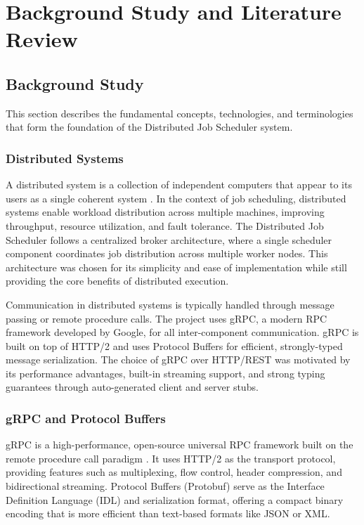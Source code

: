 \chapter{Background Study and Literature Review}

\section{Background Study}

This section describes the fundamental concepts, technologies, and terminologies that form the foundation of the Distributed Job Scheduler system.

\subsection{Distributed Systems}

A distributed system is a collection of independent computers that appear to its users as a single coherent system \cite{vansteen2017distributed}. In the context of job scheduling, distributed systems enable workload distribution across multiple machines, improving throughput, resource utilization, and fault tolerance. The Distributed Job Scheduler follows a centralized broker architecture, where a single scheduler component coordinates job distribution across multiple worker nodes. This architecture was chosen for its simplicity and ease of implementation while still providing the core benefits of distributed execution.

Communication in distributed systems is typically handled through message passing or remote procedure calls. The project uses gRPC, a modern RPC framework developed by Google, for all inter-component communication. gRPC is built on top of HTTP/2 and uses Protocol Buffers for efficient, strongly-typed message serialization. The choice of gRPC over HTTP/REST was motivated by its performance advantages, built-in streaming support, and strong typing guarantees through auto-generated client and server stubs.

\subsection{gRPC and Protocol Buffers}

gRPC is a high-performance, open-source universal RPC framework built on the remote procedure call paradigm \cite{grpcdocs}. It uses HTTP/2 as the transport protocol, providing features such as multiplexing, flow control, header compression, and bidirectional streaming. Protocol Buffers (Protobuf) serve as the Interface Definition Language (IDL) and serialization format, offering a compact binary encoding that is more efficient than text-based formats like JSON or XML.


